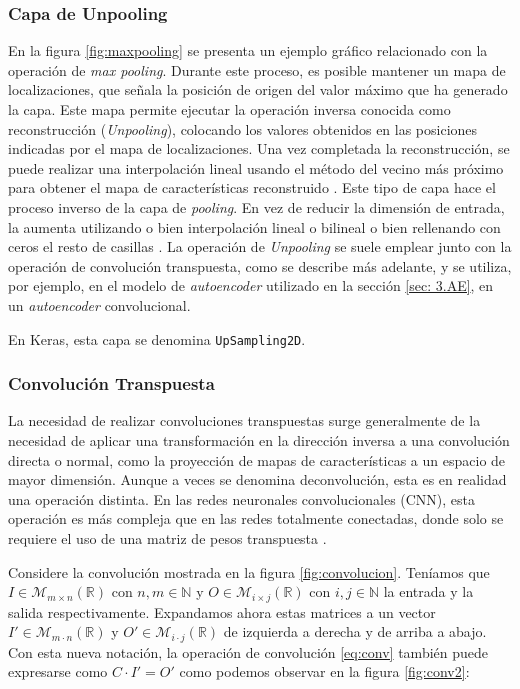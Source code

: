 \subsubsection*{Capa de Unpooling}

En la figura \ref{fig:maxpooling} se presenta un ejemplo gráfico relacionado con la operación de \textit{max pooling}. Durante este proceso, es posible mantener un mapa de localizaciones, que señala la posición de origen del valor máximo que ha generado la capa. Este mapa permite ejecutar la operación inversa conocida como reconstrucción (\textit{Unpooling}), colocando los valores obtenidos en las posiciones indicadas por el mapa de localizaciones. Una vez completada la reconstrucción, se puede realizar una interpolación lineal usando el método del vecino más próximo para obtener el mapa de características reconstruido \citep{pajares2021aprendizaje}. Este tipo de capa hace el proceso inverso de la capa de \textit{pooling}. En vez de reducir la dimensión de entrada, la aumenta utilizando o bien interpolación lineal o bilineal o bien rellenando con ceros el resto de casillas \citep{pajares2021aprendizaje}. La operación de \textit{Unpooling} se suele emplear junto con la operación de convolución transpuesta, como se describe más adelante, y se utiliza, por ejemplo, en el modelo de \textit{autoencoder} utilizado en la sección \ref{sec: 3.AE}, en un \textit{autoencoder} convolucional.

En Keras, esta capa se denomina \lstinline|UpSampling2D|.


\subsubsection*{Convolución Transpuesta}

La necesidad de realizar convoluciones transpuestas surge generalmente de la necesidad de aplicar una transformación en la dirección inversa a una convolución directa o normal, como la proyección de mapas de características a un espacio de mayor dimensión. Aunque a veces se denomina deconvolución, esta es en realidad una operación distinta. En las redes neuronales convolucionales (CNN), esta operación es más compleja que en las redes totalmente conectadas, donde solo se requiere el uso de una matriz de pesos transpuesta \citep{pajares2021aprendizaje}.

Considere la convolución mostrada en la figura \ref{fig:convolucion}. Teníamos que $I \in \mathcal{M}_{m\times n}(\mathbb{R})$ con $n,m \in \mathbb{N}$ y $O \in \mathcal{M}_{i\times j}(\mathbb{R})$ con $i,j \in \mathbb{N}$ la entrada y la salida respectivamente. Expandamos ahora estas matrices a un vector $I' \in \mathcal{M}_{m\cdot n}(\mathbb{R})$ y $O' \in \mathcal{M}_{i\cdot j}(\mathbb{R})$ de izquierda a derecha y de arriba a abajo. Con esta nueva notación, la operación de convolución \ref{eq:conv} también puede expresarse como $C \cdot I' = O'$ como podemos observar en la figura \ref{fig:conv2}:

